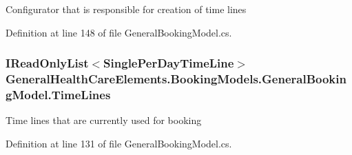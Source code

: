 Configurator that is responsible for creation of time lines 



Definition at line 148 of file General\+Booking\+Model.\+cs.

\subsubsection[{\texorpdfstring{Time\+Lines}{TimeLines}}]{\setlength{\rightskip}{0pt plus 5cm}I\+Read\+Only\+List$<${\bf Single\+Per\+Day\+Time\+Line}$>$ General\+Health\+Care\+Elements.\+Booking\+Models.\+General\+Booking\+Model.\+Time\+Lines\hspace{0.3cm}{\ttfamily [get]}}\hypertarget{class_general_health_care_elements_1_1_booking_models_1_1_general_booking_model_a07ec597c2d4ddd92525a1bfcdf0c44c7}{}\label{class_general_health_care_elements_1_1_booking_models_1_1_general_booking_model_a07ec597c2d4ddd92525a1bfcdf0c44c7}


Time lines that are currently used for booking 



Definition at line 131 of file General\+Booking\+Model.\+cs.

